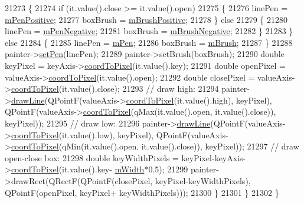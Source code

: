 \begin{DoxyCode}
21273       \{
21274         \textcolor{keywordflow}{if} (it.value().close >= it.value().open)
21275         \{
21276           linePen = \hyperlink{class_q_c_p_financial_aa6599186f417ba615caebb3f6c762bd8}{mPenPositive};
21277           boxBrush = \hyperlink{class_q_c_p_financial_ab7e6eed16260a2f88ca6bd940dffea79}{mBrushPositive};
21278         \} \textcolor{keywordflow}{else}
21279         \{
21280           linePen = \hyperlink{class_q_c_p_financial_a263fbfefde2cc19c8d4024a8319c2bbb}{mPenNegative};
21281           boxBrush = \hyperlink{class_q_c_p_financial_acb0e31874b7a1deb56bd42e8ab3e68f2}{mBrushNegative};
21282         \}
21283       \} \textcolor{keywordflow}{else}
21284       \{
21285         linePen = \hyperlink{class_q_c_p_abstract_plottable_a67bc0622fd1b9fa14e54c14922dcec66}{mPen};
21286         boxBrush = \hyperlink{class_q_c_p_abstract_plottable_a33f00674c0161c13315ab9da0895418e}{mBrush};
21287       \}
21288       painter->\hyperlink{class_q_c_p_painter_af9c7a4cd1791403901f8c5b82a150195}{setPen}(linePen);
21289       painter->setBrush(boxBrush);
21290       \textcolor{keywordtype}{double} keyPixel = keyAxis->\hyperlink{class_q_c_p_axis_a985ae693b842fb0422b4390fe36d299a}{coordToPixel}(it.value().key);
21291       \textcolor{keywordtype}{double} openPixel = valueAxis->\hyperlink{class_q_c_p_axis_a985ae693b842fb0422b4390fe36d299a}{coordToPixel}(it.value().open);
21292       \textcolor{keywordtype}{double} closePixel = valueAxis->\hyperlink{class_q_c_p_axis_a985ae693b842fb0422b4390fe36d299a}{coordToPixel}(it.value().close);
21293       \textcolor{comment}{// draw high:}
21294       painter->\hyperlink{class_q_c_p_painter_a0b4b1b9bd495e182c731774dc800e6e0}{drawLine}(QPointF(valueAxis->\hyperlink{class_q_c_p_axis_a985ae693b842fb0422b4390fe36d299a}{coordToPixel}(it.value().high), keyPixel), 
      QPointF(valueAxis->\hyperlink{class_q_c_p_axis_a985ae693b842fb0422b4390fe36d299a}{coordToPixel}(qMax(it.value().open, it.value().close)), keyPixel));
21295       \textcolor{comment}{// draw low:}
21296       painter->\hyperlink{class_q_c_p_painter_a0b4b1b9bd495e182c731774dc800e6e0}{drawLine}(QPointF(valueAxis->\hyperlink{class_q_c_p_axis_a985ae693b842fb0422b4390fe36d299a}{coordToPixel}(it.value().low), keyPixel), 
      QPointF(valueAxis->\hyperlink{class_q_c_p_axis_a985ae693b842fb0422b4390fe36d299a}{coordToPixel}(qMin(it.value().open, it.value().close)), keyPixel));
21297       \textcolor{comment}{// draw open-close box:}
21298       \textcolor{keywordtype}{double} keyWidthPixels = keyPixel-keyAxis->\hyperlink{class_q_c_p_axis_a985ae693b842fb0422b4390fe36d299a}{coordToPixel}(it.value().key-
      \hyperlink{class_q_c_p_financial_af630e5eb8485146b9c777e63fd1cf993}{mWidth}*0.5);
21299       painter->drawRect(QRectF(QPointF(closePixel, keyPixel-keyWidthPixels), QPointF(openPixel, keyPixel+
      keyWidthPixels)));
21300     \}
21301   \}
21302 \}
\end{DoxyCode}


